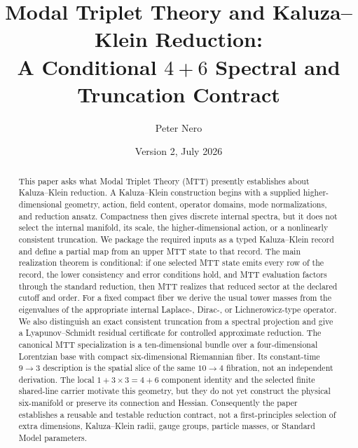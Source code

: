 \documentclass[11pt]{article}
\title{\vspace{-1em}
Modal Triplet Theory and Kaluza--Klein Reduction:\\[0.25em]
\large A Conditional \(4+6\) Spectral and Truncation Contract}
\author{Peter Nero}
\date{Version 2, July 2026}
\theoremstyle{definition}
\theoremstyle{remark}
\begin{document}
\maketitle

\begin{abstract}
This paper asks what Modal Triplet Theory (MTT) presently establishes about
Kaluza--Klein reduction.  A Kaluza--Klein construction begins with a supplied
higher-dimensional geometry, action, field content, operator domains, mode
normalizations, and reduction ansatz.  Compactness then gives discrete
internal spectra, but it does not select the internal manifold, its scale,
the higher-dimensional action, or a nonlinearly consistent truncation.  We
package the required inputs as a typed Kaluza--Klein record and define a
partial map from an upper MTT state to that record.  The main realization
theorem is conditional: if one selected MTT state emits every row of the
record, the lower consistency and error conditions hold, and MTT evaluation
factors through the standard reduction, then MTT realizes that reduced sector
at the declared cutoff and order.  For a fixed compact fiber we derive the
usual tower masses from the eigenvalues of the appropriate internal
Laplace-, Dirac-, or Lichnerowicz-type operator.  We also distinguish an
exact consistent truncation from a spectral projection and give a
Lyapunov--Schmidt residual certificate for controlled approximate reduction.
The canonical MTT specialization is a ten-dimensional bundle over a
four-dimensional Lorentzian base with compact six-dimensional Riemannian
fiber.  Its constant-time \(9\to3\) description is the spatial slice of the
same \(10\to4\) fibration, not an independent derivation.  The local
\(1+3\times3=4+6\) component identity and the selected finite shared-line
carrier motivate this geometry, but they do not yet construct the physical
six-manifold or preserve its connection and Hessian.  Consequently the
paper establishes a reusable and testable reduction contract, not a
first-principles selection of extra dimensions, Kaluza--Klein radii, gauge
groups, particle masses, or Standard Model parameters.
\end{abstract}
\end{document}
